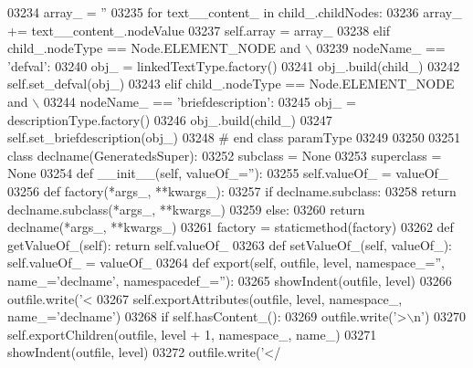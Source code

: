 \begin{DoxyCode}
{{{{{{{{{{{{{{{{{{{{{{{{{{{{{{{{{{{{{{{{{{{{{{{{{{{{{{{{{{{{{{{{{{{{{{{{{{{{{{{{{{{{{{{{{{{{{{{{{{{{{{{{{{{{{{{{{{{{{{{{{{{{{{{{{{{{{{{{{{{{{{{{{{{{{{{{{{{{{{{{{{{{{{{{{{{{{{{{{{{{{{{{{{{{{{{{{{{{{{{{{{{{{{{{{{{{{03234             array\_ = \textcolor{stringliteral}{''}
03235             \textcolor{keywordflow}{for} text\_\_content\_ \textcolor{keywordflow}{in} child\_.childNodes:
03236                 array\_ += text\_\_content\_.nodeValue
03237             self.array = array\_
03238         \textcolor{keywordflow}{elif} child\_.nodeType == Node.ELEMENT\_NODE \textcolor{keywordflow}{and} \(\backslash\)
03239             nodeName\_ == \textcolor{stringliteral}{'defval'}:
03240             obj\_ = linkedTextType.factory()
03241             obj\_.build(child\_)
03242             self.set\_defval(obj\_)
03243         \textcolor{keywordflow}{elif} child\_.nodeType == Node.ELEMENT\_NODE \textcolor{keywordflow}{and} \(\backslash\)
03244             nodeName\_ == \textcolor{stringliteral}{'briefdescription'}:
03245             obj\_ = descriptionType.factory()
03246             obj\_.build(child\_)
03247             self.set\_briefdescription(obj\_)
03248 \textcolor{comment}{# end class paramType}
03249 
03250 
03251 \textcolor{keyword}{class }declname(GeneratedsSuper):
03252     subclass = \textcolor{keywordtype}{None}
03253     superclass = \textcolor{keywordtype}{None}
03254     \textcolor{keyword}{def }__init__(self, valueOf\_=''):
03255         self.valueOf_ = valueOf\_
03256     \textcolor{keyword}{def }factory(*args\_, **kwargs\_):
03257         \textcolor{keywordflow}{if} declname.subclass:
03258             \textcolor{keywordflow}{return} declname.subclass(*args\_, **kwargs\_)
03259         \textcolor{keywordflow}{else}:
03260             \textcolor{keywordflow}{return} declname(*args\_, **kwargs\_)
03261     factory = staticmethod(factory)
03262     \textcolor{keyword}{def }getValueOf_(self): \textcolor{keywordflow}{return} self.valueOf\_
03263     \textcolor{keyword}{def }setValueOf_(self, valueOf\_): self.valueOf\_ = valueOf\_
03264     \textcolor{keyword}{def }export(self, outfile, level, namespace\_='', name\_='declname', namespacedef\_=''):
03265         showIndent(outfile, level)
03266         outfile.write(\textcolor{stringliteral}{'<%
03267         self.exportAttributes(outfile, level, namespace\_, name\_=\textcolor{stringliteral}{'declname'})
03268         \textcolor{keywordflow}{if} self.hasContent_():
03269             outfile.write(\textcolor{stringliteral}{'>\(\backslash\)n'})
03270             self.exportChildren(outfile, level + 1, namespace\_, name\_)
03271             showIndent(outfile, level)
03272             outfile.write(\textcolor{stringliteral}{'</%
}}}}}}}}}}}}}}}}}}}}}}}}}}}}}}}}}}}}}}}}}}}}}}}}}}}}}}}}}}}}}}}}}}}}}}}}}}}}}}}}}}}}}}}}}}}}}}}}}}}}}}}}}}}}}}}}}}}}}}}}}}}}}}}}}}}}}}}}}}}}}}}}}}}}}}}}}}}}}}}}}}}}}}}}}}}}}}}}}}}}}}}}}}}}}}}}}}}}}}}}}}}}}}}}}}}}}}}
\end{DoxyCode}
